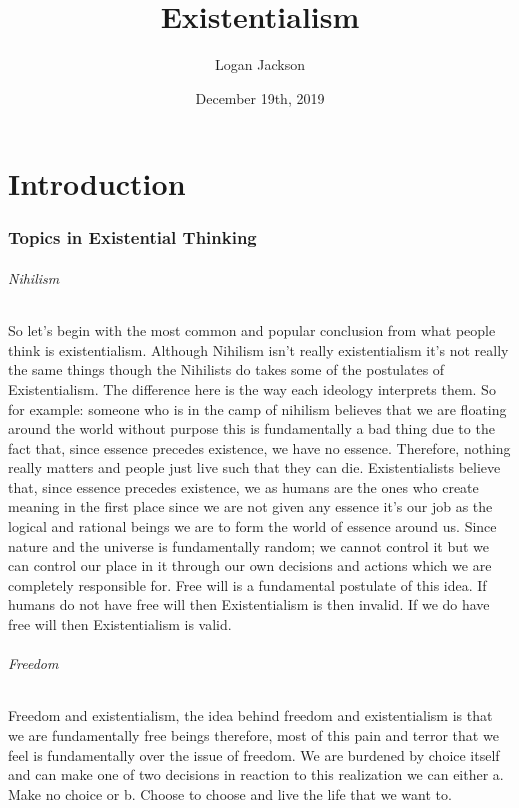 \documentclass{book}
\author{Logan Jackson}
\title{Existentialism}
\date{December 19th, 2019}
\begin{document}
\maketitle
\part{Introduction}
\section{Topics in Existential Thinking}
\paragraph{Nihilism}
So let's begin with the most common and popular conclusion from what people think is existentialism. Although Nihilism isn't really existentialism it's not really the same things though the Nihilists do takes some of the postulates of Existentialism. The difference here is the way each ideology interprets them. So for example: someone who is in the camp of nihilism believes that we are floating around the world without purpose this is fundamentally a bad thing due to the fact that, since essence precedes existence, we have no essence. Therefore, nothing really matters and people just live such that they can die. Existentialists believe that, since essence precedes existence, we as humans are the ones who create meaning in the first place since we are not given any essence it's our job as the logical and rational beings we are to form the world of essence around us. Since nature and the universe is fundamentally random; we cannot control it but we can control our place in it through our own decisions and actions which we are completely responsible for. Free will is a fundamental postulate of this idea. If humans do not have free will then Existentialism is then invalid. If we do have free will then Existentialism is valid.
\paragraph{Freedom}
Freedom and existentialism, the idea behind freedom and existentialism is that we are fundamentally free beings therefore, most of this pain and terror that we feel is fundamentally over the issue of freedom. We are burdened by choice itself and can make one of two decisions in reaction to this realization we can either a. Make no choice or b. Choose to choose and live the life that we want to. 
\end{document}
